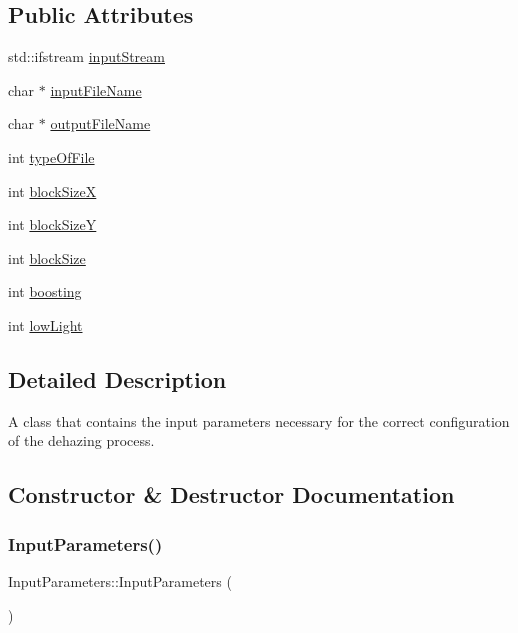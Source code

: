 \subsection*{Public Attributes}
\begin{DoxyCompactItemize}
\item 
std\+::ifstream \mbox{\hyperlink{classInputParameters_a01444453de5dc29f533e1c783b9507ca}{input\+Stream}}
\item 
char $\ast$ \mbox{\hyperlink{classInputParameters_acc0101435d7d373b40d07a73402ee0b5}{input\+File\+Name}}
\item 
char $\ast$ \mbox{\hyperlink{classInputParameters_a600055c1868b95a16fad133a356324f9}{output\+File\+Name}}
\item 
int \mbox{\hyperlink{classInputParameters_a826c20599ad2c8d4f82f1b84055668dd}{type\+Of\+File}}
\item 
int \mbox{\hyperlink{classInputParameters_a4386973ae0bf43b9040f2bbd0acfcdc0}{block\+SizeX}}
\item 
int \mbox{\hyperlink{classInputParameters_af52112e4d8fbd0e3b137bbb8396222ed}{block\+SizeY}}
\item 
int \mbox{\hyperlink{classInputParameters_a0a4b4c27431edde22c7c53746543f3c3}{block\+Size}}
\item 
int \mbox{\hyperlink{classInputParameters_a3a6b7bb91a4bc6f912a1c7744109dbb1}{boosting}}
\item 
int \mbox{\hyperlink{classInputParameters_a79b3781b35f652c9ffea72703f0f69c4}{low\+Light}}
\end{DoxyCompactItemize}


\subsection{Detailed Description}
A class that contains the input parameters necessary for the correct configuration of the dehazing process. 

\subsection{Constructor \& Destructor Documentation}
\mbox{\label{classInputParameters_a2ede6d73636729561755f9ca986475f8}} 
\subsubsection{\texorpdfstring{Input\+Parameters()}{InputParameters()}}
{\footnotesize\ttfamily Input\+Parameters\+::\+Input\+Parameters (\begin{DoxyParamCaption}{ }\end{DoxyParamCaption})}

